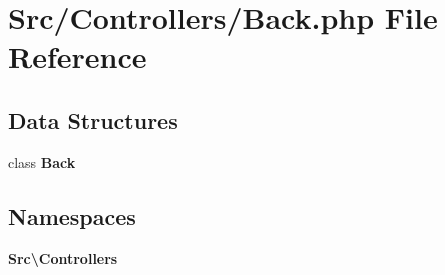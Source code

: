 \section{Src/\+Controllers/\+Back.php File Reference}
\label{_back_8php}
\subsection*{Data Structures}
\begin{DoxyCompactItemize}
\item 
class \textbf{ Back}
\end{DoxyCompactItemize}
\subsection*{Namespaces}
\begin{DoxyCompactItemize}
\item 
 \textbf{ Src\textbackslash{}\+Controllers}
\end{DoxyCompactItemize}
